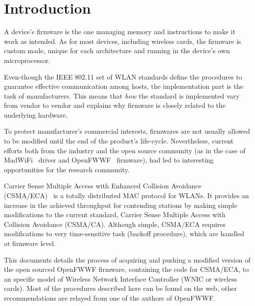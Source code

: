 \documentclass[conference]{IEEEtran}
\begin{document}

\section{Introduction}\label{introduction}
A device's firmware is the one managing memory and instructions to make it work as intended. As for most devices, including wireless cards, the firmware is custom made, unique for each architecture and running in the device's own microprocessor.

Even-though the IEEE 802.11 set of WLAN standards define the procedures to guarantee effective communication among hosts, the implementation part is the task of manufacturers. This means that \emph{how} the standard is implemented vary from vendor to vendor and explains why firmware is closely related to the underlying hardware.


To protect manufacturer's commercial interests, firmwares are not usually allowed to be modified until the end of the product's life-cycle. Nevertheless, current efforts both from the industry and the open source community (as in the case of MadWiFi~\cite{madWiFi} driver and OpenFWWF~\cite{OpenFWWF} firmware), had led to interesting opportunities for the research community.

Carrier Sense Multiple Access with Enhanced Collision Avoidance (CSMA/ECA)~\cite{barcelo2008lba} is a totally distributed MAC protocol for WLANs. It provides an increase in the achieved throughput for contending stations by making simple modifications to the current standard, Carrier Sense Multiple Access with Collision Avoidance (CSMA/CA). Although simple, CSMA/ECA requires modifications to very time-sensitive task (backoff procedure), which are handled at firmware level.

This documents details the process of acquiring and pushing a modified version of the open sourced OpenFWWF firmware, containing the code for CSMA/ECA, to an specific model of Wireless Network Interface Controller (WNIC or wireless cards). Most of the procedures described here can be found on the web, other recommendations are relayed from one of the authors of OpenFWWF.

\end{document}
